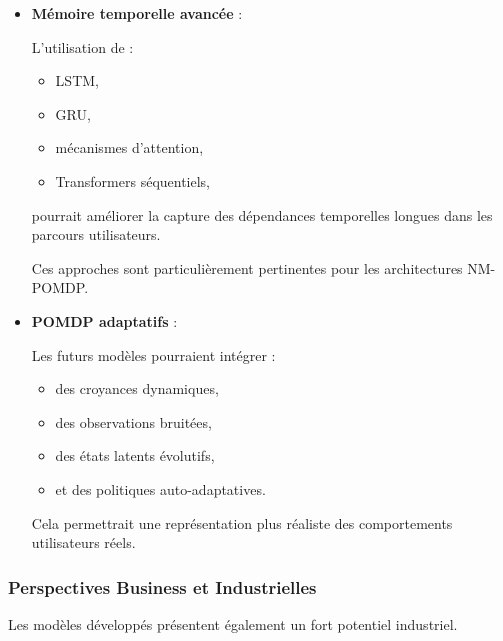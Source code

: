 \documentclass[11pt,a4paper]{article}
\begin{document}
\begin{itemize}
\vspace{0.2cm}

\item \textbf{Mémoire temporelle avancée} :

L’utilisation de :
\begin{itemize}
    \item LSTM,
    \item GRU,
    \item mécanismes d’attention,
    \item Transformers séquentiels,
\end{itemize}

pourrait améliorer la capture
des dépendances temporelles longues
dans les parcours utilisateurs.

Ces approches sont particulièrement pertinentes
pour les architectures NM-POMDP.

\vspace{0.2cm}

\item \textbf{POMDP adaptatifs} :

Les futurs modèles pourraient intégrer :
\begin{itemize}
    \item des croyances dynamiques,
    \item des observations bruitées,
    \item des états latents évolutifs,
    \item et des politiques auto-adaptatives.
\end{itemize}

Cela permettrait une représentation
plus réaliste des comportements utilisateurs réels.

\end{itemize}

\vspace{0.4cm}

\subsubsection*{Perspectives Business et Industrielles}

Les modèles développés
présentent également
un fort potentiel industriel.
\end{document}
